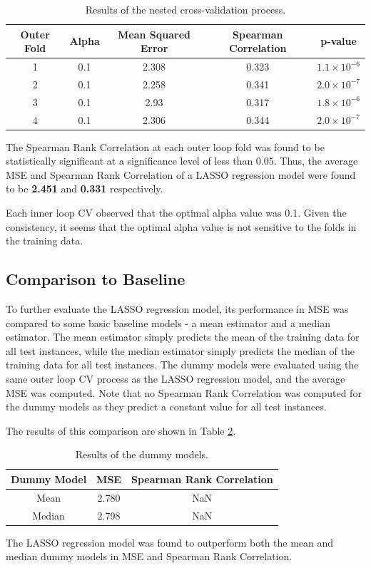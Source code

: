 \documentclass[12pt]{article}
\begin{document}
\begin{table}[H]
    \centering
    \begin{tabular}{|c|c|c|c|c|}
        \hline
        Outer Fold & Alpha & Mean Squared Error & Spearman Correlation & p-value \\
        \hline
        1 & 0.1 & 2.308 & 0.323 & $1.1 \times 10^{-6}$ \\
        2 & 0.1 & 2.258 & 0.341 & $2.0 \times 10^{-7}$ \\
        3 & 0.1 & 2.93 & 0.317 & $1.8 \times 10^{-6}$ \\
        4 & 0.1 & 2.306 & 0.344 & $2.0 \times 10^{-7}$ \\
        \hline
    \end{tabular}
    \caption{Results of the nested cross-validation process.}
    \label{tab:regression_results}
\end{table}

\vspace{-0.5cm}

The Spearman Rank Correlation at each outer loop fold was found to be statistically significant at a significance level of less than 0.05. Thus, the average MSE and Spearman Rank Correlation of a LASSO regression model were found to be \textbf{2.451} and \textbf{0.331} respectively.

Each inner loop CV observed that the optimal alpha value was 0.1. Given the consistency, it seems that the optimal alpha value is not sensitive to the folds in the training data. 

\subsection{Comparison to Baseline}
To further evaluate the LASSO regression model, its performance in MSE was compared to some basic baseline models - a mean estimator and a median estimator. The mean estimator simply predicts the mean of the training data for all test instances, while the median estimator simply predicts the median of the training data for all test instances. The dummy models were evaluated using the same outer loop CV process as the LASSO regression model, and the average MSE was computed. Note that no Spearman Rank Correlation was computed for the dummy models as they predict a constant value for all test instances.

The results of this comparison are shown in Table \ref{tab:regression_baseline}.

\begin{table}[H]
    \centering
    \begin{tabular}{|c|c|c|}
        \hline
        Dummy Model & MSE & Spearman Rank Correlation \\
        \hline
        Mean & 2.780 & NaN \\
        Median & 2.798 & NaN \\
        \hline
    \end{tabular}
    \caption{Results of the dummy models.}
    \label{tab:regression_baseline}
\end{table}

\vspace{-0.5cm}

The LASSO regression model was found to outperform both the mean and median dummy models in MSE and Spearman Rank Correlation. 

\newpage



\end{document}
